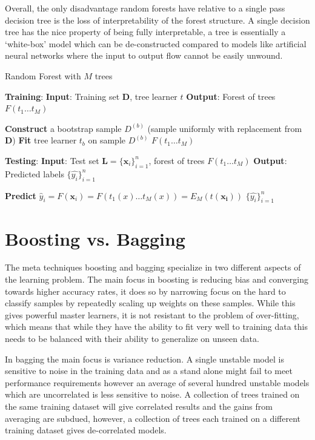 Overall, the only disadvantage random forests have relative to a single pass decision tree is the loss of interpretability of the forest structure. A single decision tree has the nice property of being fully interpretable, a tree is essentially a `white-box' model which can be de-constructed  compared to models like artificial neural networks where the input to output flow cannot be easily unwound.

\begin{algorithm}[h]
\caption{Random Forest with $M$ trees}
\begin{algorithmic}[1]
\STATE \textbf{Training}:
\STATE \textbf{Input}: Training set $\mathbf{D}$, tree learner $t$ 
\STATE \textbf{Output}: Forest of trees $F(t_{1} \ldots t_{M})$ 
\item[]
\STATE  \textbf{Construct} a bootstrap sample ${D^{(b)}}$ (sample uniformly with replacement from $\mathbf{D}$)
\STATE \textbf{Fit} tree learner $t_{b}$ on sample $D^{(b)}$
\ENDFOR
\RETURN $F(t_{1} \ldots t_{M})$  
\item[]
\STATE \textbf{Testing}:
\STATE \textbf{Input}: Test set $\mathbf{L} = \{\mathbf{x}_{i}\}_{i=1}^{n}$, forest of trees $F(t_{1} \ldots t_{M})$ 
\STATE \textbf{Output}: Predicted labels $\{\hat{y_{i}}\}_{i=1}^{n}$ 
\item[]
\STATE \textbf{Predict} $\hat{y}_{i} = F(\mathbf{x}_{i}) = F(t_{1}(x) \ldots t_{M}(x)) = E_{M}(t(\mathbf{x_{i}}))$
\ENDFOR
\RETURN $\{\hat{y_{i}}\}_{i=1}^{n}$
\end{algorithmic}
\label{rf}
\end{algorithm}

\section{Boosting vs. Bagging}

The meta techniques boosting and bagging specialize in two different aspects of the learning problem. The main focus in boosting is reducing bias and converging towards higher accuracy rates, it does so by narrowing focus on the hard to classify samples by repeatedly scaling up weights on these samples. While this gives powerful master learners, it is not resistant to the problem of over-fitting, which means that while they have the ability to fit very well to training data this needs to be balanced with their ability to generalize on unseen data. 

In bagging the main focus is variance reduction. A single unstable model is sensitive to noise in the training data and as a stand alone might fail to meet performance requirements however an average of several hundred unstable models which are uncorrelated is less sensitive to noise. A collection of trees trained on the same training dataset will give correlated results and the gains from averaging are subdued, however, a collection of trees each trained on a different training dataset gives de-correlated models. 

